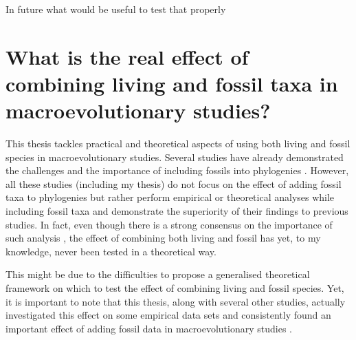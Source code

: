 In future what would be useful to test that properly



\section{What is the real effect of combining living and fossil taxa in macroevolutionary studies?} %
This thesis tackles practical and theoretical aspects of using both living and fossil species in macroevolutionary studies.
Several studies have already demonstrated the challenges and the importance of including fossils into phylogenies \citep[e.g.][]{ronquista2012,Slater2012MEE,Wood01032013,beckancient2014,Dembo2015}.
However, all these studies (including my thesis) do not focus on the effect of adding fossil taxa to phylogenies but rather perform empirical or theoretical analyses while including fossil taxa and demonstrate the superiority of their findings to previous studies.
In fact, even though there is a strong consensus on the importance of such analysis \citep{jacksonwhat2006,quentaldiversity2010,dietlconservation2011,slaterunifying2013,fritzdiversity2013,benton2015}, the effect of combining both living and fossil has yet, to my knowledge, never been tested in a theoretical way.

This might be due to the difficulties to propose a generalised theoretical framework on which to test the effect of combining living and fossil species.
Yet, it is important to note that this thesis, along with several other studies, actually investigated this effect on some empirical data sets and consistently found an important effect of adding fossil data in macroevolutionary studies \citep{Finarelli2006,Slateretal2012,Slater2012MEE,SlaterPennel2014,pant2014complex,Mitchell2015}. %

